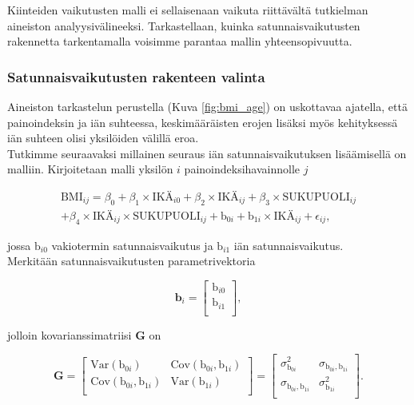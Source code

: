 \documentclass[finnish]{docopts}
\begin{document}
Kiinteiden vaikutusten malli ei sellaisenaan vaikuta riittävältä tutkielman aineiston analyysivälineeksi. Tarkastellaan, kuinka satunnaisvaikutusten rakennetta tarkentamalla voisimme parantaa mallin yhteensopivuutta.\\

\subsubsection{Satunnaisvaikutusten rakenteen valinta}
\label{ssb:satunnaisrakenneval}

Aineiston tarkastelun perustella (Kuva \ref{fig:bmi_age}) on uskottavaa ajatella, että painoindeksin ja iän suhteessa, keskimääräisten erojen lisäksi myös kehityksessä iän suhteen olisi yksilöiden välillä eroa. \\

Tutkimme seuraavaksi millainen seuraus iän satunnaisvaikutuksen lisäämisellä on malliin. Kirjoitetaan malli yksilön $i$ painoindeksihavainnolle $j$

\begin{equation}
\begin{split}
 \text{BMI}_{ij} = \beta_0 + \beta_1 \times \text{IKÄ}_{i0} + \beta_2 \times \text{IKÄ}_{ij} + \beta_3 \times \text{SUKUPUOLI}_{ij} \\
+ \beta_4 \times \text{IKÄ}_{ij} \times \text{SUKUPUOLI}_{ij} + \text{b}_{0i} + \text{b}_{1i} \times \text{IKÄ}_{ij} + \epsilon_{ij},
\label{eq:lme2}
\end{split}
\end{equation}

jossa $\text{b}_{i0}$ vakiotermin satunnaisvaikutus ja $\text{b}_{i1}$ iän satunnaisvaikutus.\\ 

Merkitään satunnaisvaikutusten parametrivektoria

$$
\bm{b}_i =
\begin{bmatrix}
\text{b}_{i0} \\
\text{b}_{i1} \\
\end{bmatrix},
$$

jolloin kovarianssimatriisi $\bm{G}$ on

$$
\bm{G} =
\begin{bmatrix}
\text{Var}(\text{b}_{0i}) & \text{Cov}(\text{b}_{0i}, \text{b}_{1i}) \\
\text{Cov}(\text{b}_{0i}, \text{b}_{1i}) & \text{Var}(\text{b}_{1i}) \\
\end{bmatrix} =
\begin{bmatrix}
\sigma^2_{\text{b}_{0i}} & \sigma_{\text{b}_{0i}, \text{b}_{1i}} \\
\sigma_{\text{b}_{0i}, \text{b}_{1i}} & \sigma^2_{\text{b}_{1i}} \\
\end{bmatrix}.
$$
\end{document}
